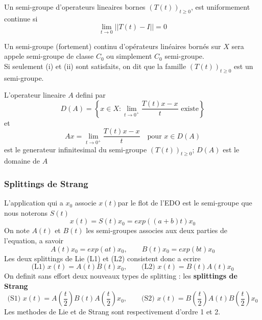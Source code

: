 \begin{remark}
	Un semi-groupe d'operateurs lineaires bornes $(T(t))_{t\geq 0}$, est uniformement continue si
	$$
	\lim_{t \rightarrow 0} ||T(t)-I||=0
	$$
\end{remark}
Un semi-groupe (fortement) continu d'opérateurs linéaires bornés sur $X$ sera appele semi-groupe de classe $C_0$ ou simplement $C_0$ semi-groupe.\\

Si seulement (i) et (ii) sont satisfaits, on dit que la famille $(T(t))_{t\geq 0}$ est un semi-groupe.
\begin{definition}
	L'operateur lineaire $A$ defini par
	\begin{equation}
	D(A)= \left \{ x \in X : \lim_{t \rightarrow 0^+} \dfrac{T(t)x-x}{t} \mbox{ existe} \right \}
	\end{equation}
	et
	\begin{equation}
	Ax=\lim_{t \rightarrow 0^+} \dfrac{T(t)x-x}{t} \quad \mbox{pour } x \in D(A)
	\end{equation}
	est le generateur infinitesimal du semi-groupe $(T(t))_{t\geq 0}$; $D(A)$ est le domaine de $A$
\end{definition}
\subsubsection{Splittings de Strang}
L’application qui a $x_0$ associe $x(t)$par le flot de l’EDO est le semi-groupe que nous noterons $S(t)$
\begin{equation}
x(t)=S(t)x_0=exp((a+b)t)x_0
\end{equation}
On note $A(t)$ et $B(t)$ les semi-groupes associes aux deux parties de l’equation, a savoir
$$
A(t)x_0=exp(at)x_0, \quad \quad B(t)x_0=exp(bt)x_0
$$
Les deux splittings de Lie (L1) et (L2) consistent donc a ecrire
$$
\mbox{(L1) } x(t)=A(t)B(t)x_0, \quad \quad \mbox{(L2) } x(t)=B(t)A(t)x_0
$$
On definit sans effort deux nouveaux types de splitting : les \textbf{splittings de Strang} \cite{Strang}
$$
\mbox{(S1) } x(t)=A(\dfrac{t}{2})B(t)A(\dfrac{t}{2})x_0, \quad \quad \mbox{(S2) } x(t)=B(\dfrac{t}{2})A(t)B(\dfrac{t}{2})x_0
$$
Les methodes de Lie et de Strang sont respectivement d’ordre 1 et 2.
